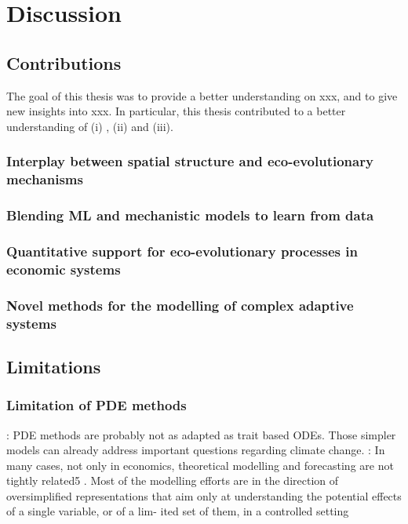 %
\chapter{Discussion}
\label{sec:conclusion}



\section{Contributions}
The goal of this thesis was to provide a better understanding on xxx, and to give new insights into xxx. In particular, this thesis contributed to a better understanding of (i) , (ii) and (iii).

\subsection{Interplay between spatial structure and eco-evolutionary mechanisms}

\subsection{Blending ML and mechanistic models to learn from data}

\subsection{Quantitative support for eco-evolutionary processes in economic systems}

\subsection{Novel methods for the modelling of complex adaptive systems}


\section{Limitations}

\subsection{Limitation of PDE methods}
\cite{Akesson2021} : PDE methods are probably not as adapted as trait based ODEs. Those simpler models can already address important questions regarding climate change.
\cite{Tacchella2018}: In many cases, not only in economics, theoretical modelling and forecasting are not tightly related5
. Most of the modelling efforts are
in the direction of oversimplified representations that aim only at understanding the potential effects of a single variable, or of a lim- ited set of them, in a controlled setting

